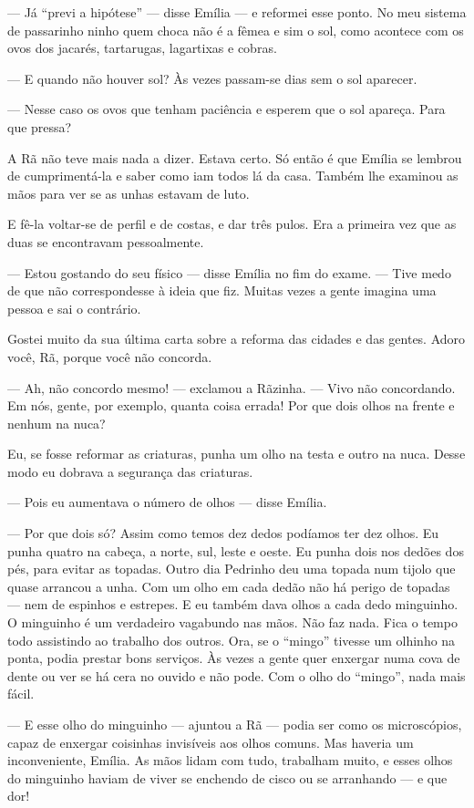 --- Já ``previ a hipótese'' --- disse Emília --- e reformei esse ponto.
No meu sistema de passarinho ninho quem choca não é a fêmea e sim o sol,
como acontece com os ovos dos jacarés, tartarugas, lagartixas e cobras.

--- E quando não houver sol? Às vezes passam-se dias sem o sol aparecer.

--- Nesse caso os ovos que tenham paciência e esperem que o sol apareça.
Para que pressa?

A Rã não teve mais nada a dizer. Estava certo. Só então é que Emília se
lembrou de cumprimentá-la e saber como iam todos lá da casa. Também lhe
examinou as mãos para ver se as unhas estavam de luto.

E fê-la voltar-se de perfil e de costas, e dar três pulos. Era a
primeira vez que as duas se encontravam pessoalmente.

--- Estou gostando do seu físico --- disse Emília no fim do exame. ---
Tive medo de que não correspondesse à ideia que fiz. Muitas vezes a
gente imagina uma pessoa e sai o contrário.

Gostei muito da sua última carta sobre a reforma das cidades e das
gentes. Adoro você, Rã, porque você não concorda.

--- Ah, não concordo mesmo! --- exclamou a Rãzinha. --- Vivo não
concordando. Em nós, gente, por exemplo, quanta coisa errada! Por que
dois olhos na frente e nenhum na nuca?

Eu, se fosse reformar as criaturas, punha um olho na testa e outro na
nuca. Desse modo eu dobrava a segurança das criaturas.

--- Pois eu aumentava o número de olhos --- disse Emília.

--- Por que dois só? Assim como temos dez dedos podíamos ter dez olhos.
Eu punha quatro na cabeça, a norte, sul, leste e oeste. Eu punha dois
nos dedões dos pés, para evitar as topadas. Outro dia Pedrinho deu uma
topada num tijolo que quase arrancou a unha. Com um olho em cada dedão
não há perigo de topadas --- nem de espinhos e estrepes. E eu também
dava olhos a cada dedo minguinho. O minguinho é um verdadeiro vagabundo
nas mãos. Não faz nada. Fica o tempo todo assistindo ao trabalho dos
outros. Ora, se o ``mingo'' tivesse um olhinho na ponta, podia prestar
bons serviços. Às vezes a gente quer enxergar numa cova de dente ou ver
se há cera no ouvido e não pode. Com o olho do ``mingo'', nada mais
fácil.

--- E esse olho do minguinho --- ajuntou a Rã --- podia ser como os
microscópios, capaz de enxergar coisinhas invisíveis aos olhos comuns.
Mas haveria um inconveniente, Emília. As mãos lidam com tudo, trabalham
muito, e esses olhos do minguinho haviam de viver se enchendo de cisco
ou se arranhando --- e que dor!

